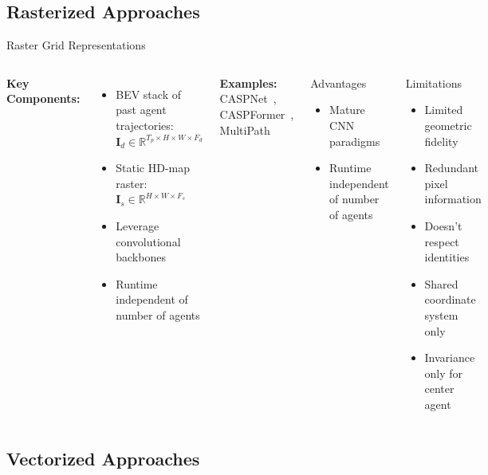 \documentclass[10pt,aspectratio=169]{beamer}
\begin{document}
\subsection{Rasterized Approaches}

\begin{frame}{Raster Grid Representations}
\begin{columns}[T]
\textbf{Key Components:}
\begin{itemize}
    \item BEV stack of past agent trajectories: $\mathbf{I}_d \in \mathbb{R}^{T_p \times H \times W \times F_d}$
    \item Static HD-map raster: $\mathbf{I}_s \in \mathbb{R}^{H \times W \times F_s}$
    \item Leverage convolutional backbones
    \item Runtime independent of number of agents
\end{itemize}

\textbf{Examples:} CASPNet~\cite{caspnetSchäfer2022}, CASPFormer~\cite{caspformerYadav2024}, MultiPath~\cite{Chai2019MultiPath}

\begin{block}{Advantages}
\begin{itemize}
    \item Mature CNN paradigms
    \item Runtime independent of number of agents
\end{itemize}
\end{block}

\begin{alertblock}{Limitations~\cite{gao2020vectornet,qcnetZhou2023}}
\begin{itemize}
    \item Limited geometric fidelity
    \item Redundant pixel information
    \item Doesn't respect identities
    \item Shared coordinate system only
    \item Invariance only for center agent
\end{itemize}
\end{alertblock}
\end{columns}
\end{frame}

\subsection{Vectorized Approaches}
\end{document}
